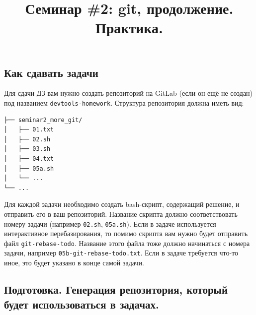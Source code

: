 \documentclass{article}
\begin{document}
\title{Семинар \#2: git, продолжение. Практика. \vspace{-5ex}}\date{}\maketitle

\subsection*{Как сдавать задачи}
Для сдачи ДЗ вам нужно создать репозиторий на GitLab (если он ещё не создан) под названием \texttt{devtools-homework}. Структура репозитория должна иметь вид:
\begin{center}
\begin{BVerbatim}
├── seminar2_more_git/
│   ├── 01.txt
│   ├── 02.sh
│   ├── 03.sh
│   ├── 04.txt
│   ├── 05a.sh
│   └── ...
└── ...
\end{BVerbatim}
\end{center}
Для каждой задачи необходимо создать bash-скрипт, содержащий решение, и отправить его в ваш репозиторий. Название скрипта должно соответствовать номеру задачи (например \texttt{02.sh}, \texttt{05a.sh}). Если в задаче используется интерактивное перебазирования, то помимо скрипта вам нужно будет отправить файл \texttt{git-rebase-todo}. Название этого файла тоже должно начинаться с номера задачи, например \texttt{05b-git-rebase-todo.txt}. Если в задаче требуется что-то иное, это будет указано в конце самой задачи.


\subsection*{Подготовка. Генерация репозитория, который будет использоваться в задачах.}
\end{document}
